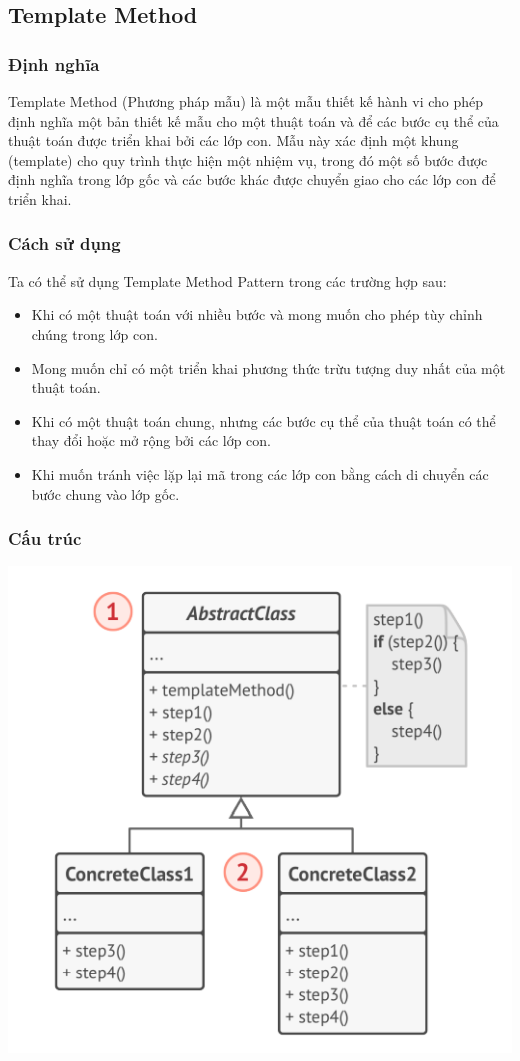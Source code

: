 \subsection{Template Method}
\subsubsection{Định nghĩa}
Template Method (Phương pháp mẫu) là một mẫu thiết kế hành vi cho phép định nghĩa một bản thiết kế mẫu cho một thuật toán và để các bước cụ thể của thuật toán được triển khai bởi các lớp con. Mẫu này xác định một khung (template) cho quy trình thực hiện một nhiệm vụ, trong đó một số bước được định nghĩa trong lớp gốc và các bước khác được chuyển giao cho các lớp con để triển khai.
\subsubsection{Cách sử dụng}
Ta có thể sử dụng Template Method Pattern trong các trường hợp sau:
\begin{itemize}
    \item Khi có một thuật toán với nhiều bước và mong muốn cho phép tùy chỉnh chúng trong lớp con.
    \item Mong muốn chỉ có một triển khai phương thức trừu tượng duy nhất của một thuật toán.
    \item Khi có một thuật toán chung, nhưng các bước cụ thể của thuật toán có thể thay đổi hoặc mở rộng bởi các lớp con.
    \item Khi muốn tránh việc lặp lại mã trong các lớp con bằng cách di chuyển các bước chung vào lớp gốc.
\end{itemize}
\subsubsection{Cấu trúc}
\begin{center}
    \includegraphics[scale=0.6]{image/behavioral/template.png}
\end{center}
